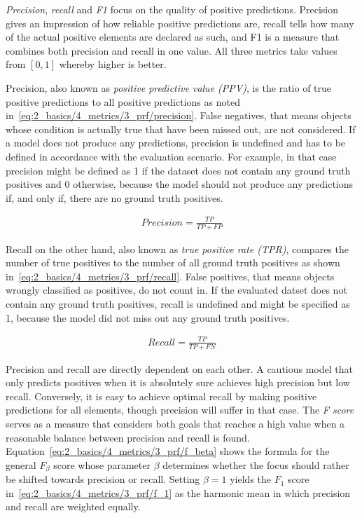 \emph{Precision}, \emph{recall} and \emph{F1} focus on the quality of positive predictions. Precision gives an impression of how reliable positive predictions are, recall tells how many of the actual positive elements are declared as such, and F1 is a measure that combines both precision and recall in one value. All three metrics take values from $[0, 1]$ whereby higher is better.

Precision, also known as \emph{positive predictive value (PPV)}, is the ratio of true positive predictions to all positive predictions as noted in~\ref{eq:2_basics/4_metrics/3_prf/precision}. False negatives, that means objects whose condition is actually true that have been missed out, are not considered. If a model does not produce any predictions, precision is undefined and has to be defined in accordance with the evaluation scenario. For example, in that case precision might be defined as 1 if the dataset does not contain any ground truth positives and 0 otherwise, because the model should not produce any predictions if, and only if, there are no ground truth positives.

\begin{align}
    Precision = \frac{TP}{TP + FP}
    \label{eq:2_basics/4_metrics/3_prf/precision}
\end{align}

Recall on the other hand, also known as \emph{true positive rate (TPR)}, compares the number of true positives to the number of all ground truth positives as shown in~\ref{eq:2_basics/4_metrics/3_prf/recall}. False positives, that means objects wrongly classified as positives, do not count in. If the evaluated datset does not contain any ground truth positives, recall is undefined and might be specified as 1, because the model did not miss out any ground truth positives.

\begin{align}
    Recall = \frac{TP}{TP + FN}
    \label{eq:2_basics/4_metrics/3_prf/recall}
\end{align}

Precision and recall are directly dependent on each other. A cautious model that only predicts positives when it is absolutely sure achieves high precision but low recall. Conversely, it is easy to achieve optimal recall by making positive predictions for all elements, though precision will suffer in that case. The \emph{F score} serves as a measure that considers both goals that reaches a high value when a reasonable balance between precision and recall is found. Equation~\ref{eq:2_basics/4_metrics/3_prf/f_beta} shows the formula for the general $F_\beta$ score whose parameter $\beta$ determines whether the focus should rather be shifted towards precision or recall. Setting $\beta = 1$ yields the $F_1$ score in~\ref{eq:2_basics/4_metrics/3_prf/f_1} as the harmonic mean in which precision and recall are weighted equally.


